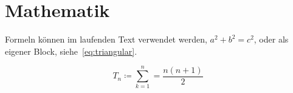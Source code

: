 \section{Mathematik}

Formeln können im laufenden Text verwendet werden, \(a^2 + b^2 = c^2\),
oder als eigener Block, siehe~\cref{eq:triangular}.

\begin{equation}
  \label{eq:triangular}
  T_n \coloneqq \sum^{n}_{k=1} = \frac{n(n+1)}{2}
\end{equation}
